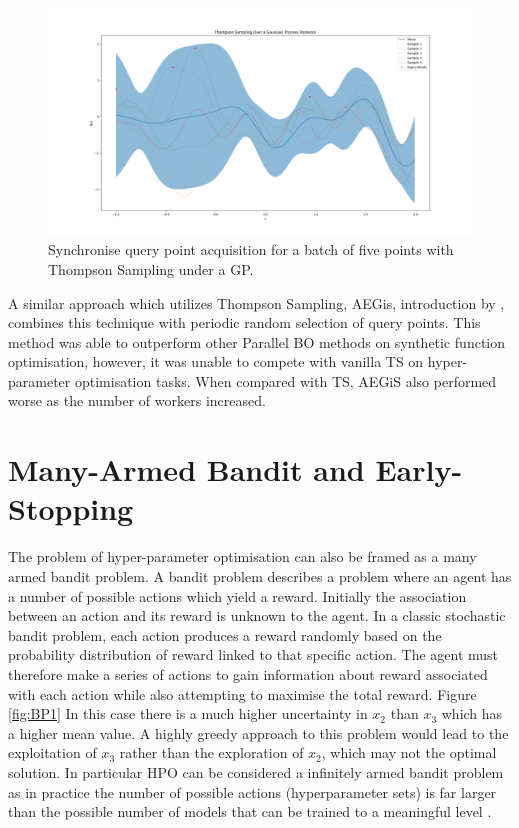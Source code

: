 \documentclass{article}
\begin{document}
			\begin{figure}[h]	


			\includegraphics[trim=20 0 0 0 ,scale=0.25]{TS.png}

			\caption{Synchronise query point acquisition for a batch of five points with Thompson Sampling under a GP.}
			\label{fig:TS1}

			\end{figure}


			A similar approach which utilizes Thompson Sampling, AEGis, introduction by \cite{26}, combines this technique with periodic random selection of query points. This method was able to outperform other Parallel BO methods on synthetic function optimisation, however, it was unable to compete with vanilla TS on hyper-parameter optimisation tasks. When compared with TS, AEGiS also performed worse as the number of workers increased.


\section {Many-Armed Bandit and Early-Stopping}\label{bandit}



	The problem of hyper-parameter optimisation can also be framed as a many armed bandit problem. A bandit problem describes a problem where an agent has a number of possible actions which yield a reward. Initially the association between an action and its reward is unknown to the agent. In a classic stochastic bandit problem, each action produces a reward randomly based on the probability distribution of reward linked to that specific action. The agent must therefore make a series of actions to gain information about reward associated with each action while also attempting to maximise the total reward. Figure \ref{fig:BP1} In this case there is a much higher uncertainty in \(x_2\) than \(x_3\) which has a higher mean value. A highly greedy approach to this problem would lead to the exploitation of \(x_3\) rather than the exploration of \(x_2\), which may not the optimal solution. In particular HPO can be considered a infinitely armed bandit problem as in practice the number of possible actions (hyperparameter sets) is far larger than the possible number of models that can be trained to a meaningful level \cite{infbandit}.
\end{document}

